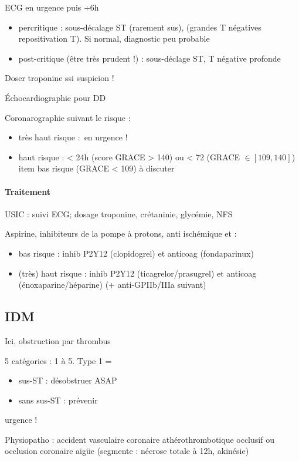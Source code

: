 ECG en urgence \skull puis +6h
\begin{itemize}
  \item percritique : sous-décalage ST (rarement sus), (grandes T négatives \lor{}
    repositivation T). Si normal, diagnostic peu probable
  \item post-critique (être très prudent !) : sous-déclage ST, T négative
    profonde
\end{itemize}
Doser troponine ssi suspicion !

Échocardiographie pour DD

Coronarographie suivant le risque :
\begin{itemize}
  \item très haut risque : en urgence !
  \item haut risque : < 24h (score GRACE > 140) ou < 72 (GRACE $\in [109, 140]$)
  item bas risque (GRACE < 109)  à discuter 
\end{itemize}

\paragraph{Traitement}
USIC : suivi ECG; dosage troponine, crétaninie, glycémie, NFS

Aspirine, inhibiteurs de la pompe à protons, anti ischémique et :
\begin{itemize}
  \item bas risque : inhib P2Y12 (clopidogrel) et anticoag (fondaparinux)
  \item (très) haut risque : inhib P2Y12 (ticagrelor/prasugrel) et anticoag
    (énoxaparine/héparine) (+ anti-GPIIb/IIIa suivant)
\end{itemize}

\subsection{IDM}

Ici, obstruction par thrombus

5 catégories : 1 à 5. Type 1 = 
\begin{itemize}
  \item sus-ST : désobstruer ASAP
  \item sans sus-ST : prévenir
\end{itemize}
\danger urgence ! \skull

Physiopatho : accident vasculaire coronaire athérothrombotique occlusif ou
occlusion coronaire aigüe (segmente : nécrose totale à 12h, akinésie)

